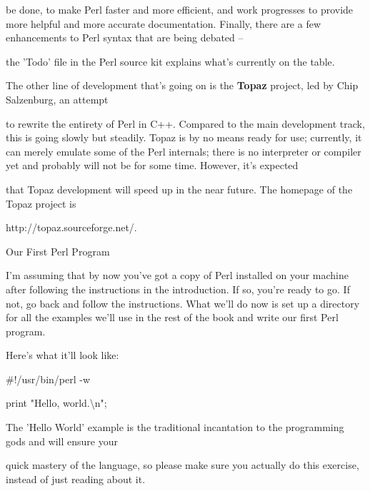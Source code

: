 \documentclass[a4paper,11pt]{book}
\begin{document}
\noindent be done, to make Perl faster and more efficient, and work progresses to provide more helpful and more accurate documentation. Finally, there are a few enhancements to Perl syntax that are being debated --

\noindent the 'Todo' file in the Perl source kit explains what's currently on the table.

\noindent 

\noindent The other line of development that's going on is the \textbf{Topaz }project, led by Chip Salzenburg, an attempt

\noindent to rewrite the entirety of Perl in C++. Compared to the main development track, this is going slowly but steadily. Topaz is by no means ready for use; currently, it can merely emulate some of the Perl internals; there is no interpreter or compiler yet and probably will not be for some time. However, it's expected

\noindent that Topaz development will speed up in the near future. The homepage of the Topaz project is

\noindent http://topaz.sourceforge.net/.

\noindent 

\noindent 

\noindent Our First Perl Program

\noindent 

\noindent I'm assuming that by now you've got a copy of Perl installed on your machine after following the instructions in the introduction. If so, you're ready to go. If not, go back and follow the instructions. What we'll do now is set up a directory for all the examples we'll use in the rest of the book and write our first Perl program.

\noindent 

\noindent Here's what it'll look like:

\noindent 

\noindent \#!/usr/bin/perl -w

\noindent 

\noindent print "Hello, world.\textbackslash n";

\noindent 

\noindent 

\noindent The 'Hello World' example is the traditional incantation to the programming gods and will ensure your

\noindent quick mastery of the language, so please make sure you actually do this exercise, instead of just reading about it.
\end{document}
